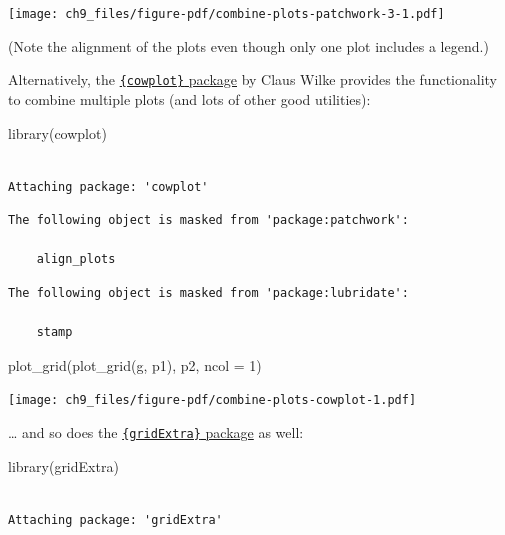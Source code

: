 \documentclass[
  letterpaper,
  DIV=11,
  numbers=noendperiod]{scrreprt}
\newenvironment{Shaded}{\begin{snugshade}}{\end{snugshade}}
\newcommand{\AttributeTok}[1]{\textcolor[rgb]{0.40,0.45,0.13}{#1}}
\newcommand{\DecValTok}[1]{\textcolor[rgb]{0.68,0.00,0.00}{#1}}
\newcommand{\FunctionTok}[1]{\textcolor[rgb]{0.28,0.35,0.67}{#1}}
\newcommand{\NormalTok}[1]{\textcolor[rgb]{0.00,0.23,0.31}{#1}}
\begin{document}
\texttt{[image: ch9\_files/figure-pdf/combine-plots-patchwork-3-1.pdf]}

(Note the alignment of the plots even though only one plot includes a
legend.)

Alternatively, the
\href{https://wilkelab.org/cowplot/articles/introduction.html}{\texttt{\{cowplot\}}
package} by Claus Wilke provides the functionality to combine multiple
plots (and lots of other good utilities):

\begin{Shaded}
\begin{Highlighting}[]
\FunctionTok{library}\NormalTok{(cowplot)}
\end{Highlighting}
\end{Shaded}

\begin{verbatim}

Attaching package: 'cowplot'
\end{verbatim}

\begin{verbatim}
The following object is masked from 'package:patchwork':

    align_plots
\end{verbatim}

\begin{verbatim}
The following object is masked from 'package:lubridate':

    stamp
\end{verbatim}

\begin{Shaded}
\begin{Highlighting}[]
\FunctionTok{plot\_grid}\NormalTok{(}\FunctionTok{plot\_grid}\NormalTok{(g, p1), p2, }\AttributeTok{ncol =} \DecValTok{1}\NormalTok{)}
\end{Highlighting}
\end{Shaded}

\texttt{[image: ch9\_files/figure-pdf/combine-plots-cowplot-1.pdf]}

\ldots{} and so does the
\href{https://cran.r-project.org/web/packages/gridExtra/vignettes/arrangeGrob.html}{\texttt{\{gridExtra\}}
package} as well:

\begin{Shaded}
\begin{Highlighting}[]
\FunctionTok{library}\NormalTok{(gridExtra)}
\end{Highlighting}
\end{Shaded}

\begin{verbatim}

Attaching package: 'gridExtra'
\end{verbatim}
\end{document}
